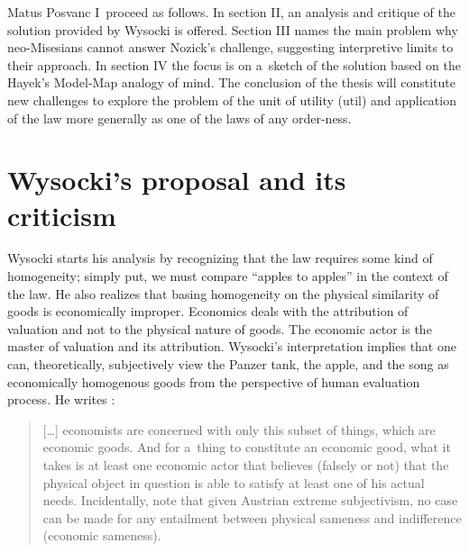 \begin{artengenv}{Matus Posvanc}
I~proceed as follows. In section II, an analysis and critique of the solution provided by Wysocki 
\parencite*[][]{Wysocki2021problem} %
 is offered. Section III names the main problem why neo-Misesians cannot answer Nozick's challenge, suggesting interpretive limits to their approach. In section IV the focus is on a~sketch of the solution based on the Hayek's Model-Map analogy of mind. The conclusion of the thesis will constitute new challenges to explore the problem of the unit of utility (util) and application of the law more generally as one of the laws of any order-ness.



\section{Wysocki's \parencite*{Wysocki2021problem} proposal and its criticism}



Wysocki starts his analysis by recognizing that the law requires some kind of homogeneity; simply put, we must compare ``apples to apples'' in the context of the law. He also realizes that basing homogeneity on the physical similarity of goods is economically improper. Economics deals with the attribution of valuation and not to the physical nature of goods. The economic actor is the master of valuation and its attribution. Wysocki's interpretation implies that one can, theoretically, subjectively view the Panzer tank, the apple, and the song as economically homogenous goods from the perspective of human evaluation process. He writes 
\parencite[][p.14]{Wysocki2021problem}:%




\begin{quote}
[…] economists are concerned with only this subset of things, which are economic goods. And for a~thing to constitute an economic good, what it takes is at least one economic actor that believes (falsely or not) that the physical object in question is able to satisfy at least one of his actual needs. Incidentally, note that given Austrian extreme subjectivism, no case can be made for any entailment between physical sameness and indifference (economic sameness).
\end{quote}




\end{artengenv}
